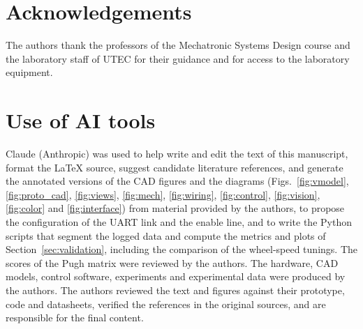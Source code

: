 \documentclass[11pt,letterpaper]{article}
\begin{document}
\section*{Acknowledgements}
The authors thank the professors of the Mechatronic Systems Design course
and the laboratory staff of UTEC for their guidance and for access to the
laboratory equipment.

\section*{Use of AI tools}
Claude (Anthropic) was used to help write and edit the text of this
manuscript, format the \LaTeX{} source, suggest candidate literature
references, and generate the annotated versions of the CAD figures and
the diagrams (Figs.~\ref{fig:vmodel}, \ref{fig:proto_cad},
\ref{fig:views}, \ref{fig:mech}, \ref{fig:wiring}, \ref{fig:control},
\ref{fig:vision}, \ref{fig:color} and \ref{fig:interface}) from material
provided by the authors, to propose the configuration of the UART link
and the enable line, and to write the Python scripts that segment the
logged data and compute the metrics and plots of
Section~\ref{sec:validation}, including the comparison of the
wheel-speed tunings. The scores of the Pugh matrix were
reviewed by the authors. The
hardware, CAD models, control software, experiments and experimental
data were produced by the authors. The authors reviewed the text and
figures against their prototype, code and datasheets, verified the
references in the original sources, and are responsible for the final
content.
\end{document}
